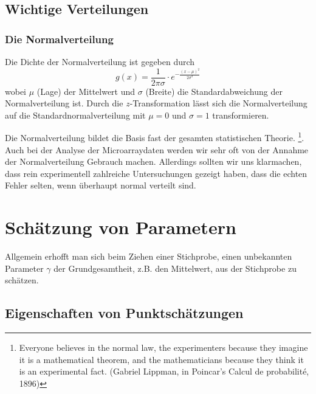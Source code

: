 %
\subsection{Wichtige Verteilungen}

\subsubsection{Die Normalverteilung}
Die Dichte der Normalverteilung ist gegeben durch
\begin{equation}\label{eqn:dichtenormal}
g(x) = \frac{1}{2\pi\sigma}\cdot e^{-\frac{(x-\mu)^2}{2\sigma^2}}
\end{equation}
wobei $\mu$ (Lage) der Mittelwert und $\sigma$ (Breite) die Standardabweichung der Normalverteilung ist. 
Durch die $z$-Transformation lässt sich die Normalverteilung auf die Standardnormalverteilung mit $\mu=0$ und $\sigma=1$ transformieren.

Die Normalverteilung bildet die Basis fast der gesamten statistischen Theorie. \footnote{ 
	\glqq Everyone believes in the normal law, the experimenters because they imagine it is a mathematical theorem, and the mathematicians because they think it is an experimental fact.\grqq{} (Gabriel Lippman, in Poincar's Calcul de probabilité, 1896)}. Auch bei der Analyse der Microarraydaten werden wir sehr oft von der Annahme der Normalverteilung Gebrauch machen. Allerdings sollten wir uns klarmachen, dass  rein experimentell zahlreiche Untersuchungen gezeigt haben, dass die echten Fehler selten, wenn überhaupt normal verteilt sind.


\section{Schätzung von Parametern}
Allgemein erhofft man sich beim Ziehen einer Stichprobe, einen unbekannten Parameter $\gamma$ der Grundgesamtheit, z.B. den Mittelwert, aus der Stichprobe zu schätzen.
\subsection{Eigenschaften von Punktschätzungen}

